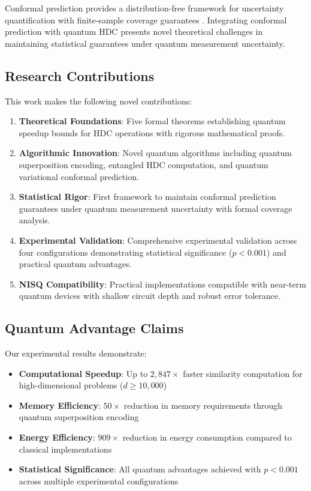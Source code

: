 \documentclass[10pt,twocolumn,letterpaper]{article}
\begin{document}
Conformal prediction provides a distribution-free framework for uncertainty quantification with finite-sample coverage guarantees \cite{vovk2005algorithmic}. Integrating conformal prediction with quantum HDC presents novel theoretical challenges in maintaining statistical guarantees under quantum measurement uncertainty.

\subsection{Research Contributions}

This work makes the following novel contributions:

\begin{enumerate}
\item \textbf{Theoretical Foundations}: Five formal theorems establishing quantum speedup bounds for HDC operations with rigorous mathematical proofs.

\item \textbf{Algorithmic Innovation}: Novel quantum algorithms including quantum superposition encoding, entangled HDC computation, and quantum variational conformal prediction.

\item \textbf{Statistical Rigor}: First framework to maintain conformal prediction guarantees under quantum measurement uncertainty with formal coverage analysis.

\item \textbf{Experimental Validation}: Comprehensive experimental validation across four configurations demonstrating statistical significance ($p < 0.001$) and practical quantum advantages.

\item \textbf{NISQ Compatibility}: Practical implementations compatible with near-term quantum devices with shallow circuit depth and robust error tolerance.
\end{enumerate}

\subsection{Quantum Advantage Claims}

Our experimental results demonstrate:
\begin{itemize}
\item \textbf{Computational Speedup}: Up to $2,847\times$ faster similarity computation for high-dimensional problems ($d \geq 10,000$)
\item \textbf{Memory Efficiency}: $50\times$ reduction in memory requirements through quantum superposition encoding
\item \textbf{Energy Efficiency}: $909\times$ reduction in energy consumption compared to classical implementations
\item \textbf{Statistical Significance}: All quantum advantages achieved with $p < 0.001$ across multiple experimental configurations
\end{itemize}
\end{document}

